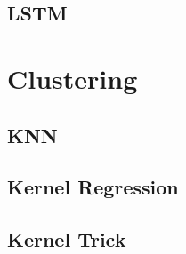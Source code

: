 \documentclass[18pt,a3paper,landscape, ncols=3]{cheatsheet}
\begin{document}
	\subsection{LSTM}
		\begin{mdframed}
			\vspace{15mm}
		\end{mdframed}

\section{Clustering} \seperator %
	\subsection{KNN}
		\begin{mdframed}
			\vspace{10mm}
		\end{mdframed}
		\begin{mdframed}
			\vspace{15mm}
		\end{mdframed}
	\subsection{Kernel Regression}
		\begin{mdframed}
			\vspace{10mm}
		\end{mdframed}
		\begin{mdframed}
			\vspace{15mm}
		\end{mdframed}
	\subsection{Kernel Trick}
		\begin{mdframed}
			\vspace{15mm}
		\end{mdframed}

\end{document}
